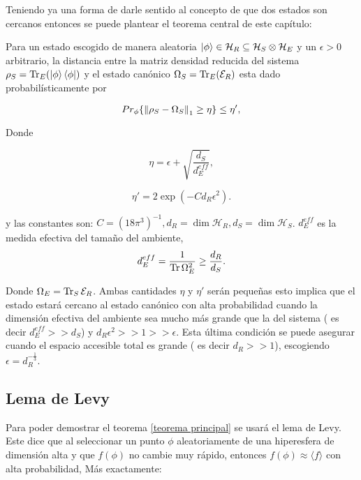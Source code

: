 Teniendo ya una forma de darle sentido al concepto de que dos estados son cercanos entonces se puede plantear el teorema central de este capítulo:
\\
\begin{theorem} \label{teorema principal}
Para un estado escogido de manera aleatoria $\ket{\phi} \in \mathcal{H}_{R} \subseteq \mathcal{H}_{S} \otimes \mathcal{H}_{E} $ y un $\epsilon > 0$ arbitrario, la distancia entre la matriz densidad reducida del sistema $\rho_{S}=\Tr_{E}(\ket{\phi} \bra{\phi})$  y el estado canónico $\Omega_{S}=\Tr_{E} ( \mathcal{E}_{R})$ esta dado probabilísticamente por 

\begin{equation}
Pr_{\phi} \{  \norm{\rho_{S} -\Omega_{S}}_{1} \geq \eta \} \leq \eta',
\end{equation}

Donde 

\begin{equation}
\eta= \epsilon + \sqrt{ \frac{d_{S}}{d_{E}^{eff}} },
\end{equation}

\begin{equation}
\eta'=2\exp (-C d_{R} \epsilon^{2} ).
\end{equation}


y las constantes son: $ C=(18 \pi^{3})^{-1}, d_{R} = \dim \mathcal{H}_{R}, d_{S} = \dim \mathcal{H}_{S} $. $d_{E}^{eff}$ es la medida efectiva del tamaño del ambiente,
\begin{equation}
d_{E}^{eff}= \frac{1}{\Tr \Omega_{E}^{2}} \ge \frac{d_{R}}{d_{S}}.
\end{equation}

Donde $\Omega_{E}= \Tr_{S} \mathcal{E}_{R}$. Ambas cantidades $\eta $ y $\eta'$ serán pequeñas esto implica que el estado estará cercano al estado canónico con alta probabilidad cuando la dimensión efectiva del ambiente sea mucho más grande que la del sistema ( es decir $d_{E}^{eff} >> d_{S}$) y  $d_{R}\epsilon^2>>1>>\epsilon$. Esta última condición se puede asegurar cuando el espacio accesible total es grande ( es decir $d_{R}>>1$), escogiendo $\epsilon=d_{R}^{-\frac{1}{3}}$.\\
\end{theorem}

\subsection{Lema de Levy}
Para poder demostrar el teorema \ref{teorema principal} se usará  el lema de Levy. Este dice que al seleccionar un punto $\phi$ aleatoriamente de una hiperesfera de dimensión alta y que $f(\phi)$ no cambie muy rápido, entonces $f(\phi) \approx \langle f \rangle $ con alta probabilidad, Más exactamente:\\

